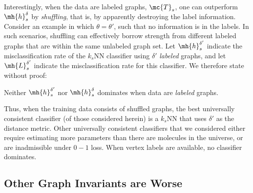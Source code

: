 \documentclass[10pt,journal,cspaper,compsoc]{IEEEtran}
\begin{document}
Interestingly, when the data are labeled graphs, $\mc{T}_s$, one can outperform $\mh{h}_s^{\delta}$ by \emph{shuffling}, that is, by apparently destroying the label information.  Consider an example in which $\theta=\theta'$, such that no information is in the labels.  In such scenarios, shuffling can effectively borrow strength from different labeled graphs that are within the same unlabeled graph set. Let $\mh{h}^{\delta'}_s$ indicate the misclassification rate of the $k_s$NN classifier using $\delta'$ \emph{labeled} graphs, and let $\mh{L}^{\delta'}_s$ indicate the misclassification rate for this classifier. We therefore state without proof:
\begin{thm} \label{thm:nodom}
	Neither $\mh{h}_s^{\delta'}$ nor $\mh{h}_s^{\delta}$ dominates when data are \emph{labeled} graphs.
\end{thm}



Thus, when the training data consists of shuffled graphs, the best universally consistent classifier (of those considered herein) is a $k_s$NN that uses $\delta'$ as the distance metric.  Other universally consistent classifiers that we considered either require estimating more parameters than there are molecules in the universe, or are inadmissible under $0-1$ loss.  When vertex labels are available, no classifier dominates. 


\subsection{Other Graph Invariants are Worse} %
\label{sub:asymptotically_optimal_classifiers}

\end{document}
